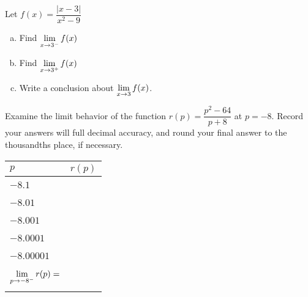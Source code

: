 \documentclass[notes]{subfiles}
\begin{document}
		\begin{ex}
			Let \(f(x) = \dfrac{|x-3|}{x^2-9}\)
			\begin{enumerate}[(a)]
				\item Find \(\displaystyle \lim_{x\to 3^-} f(x)\)
					
				\item Find \(\displaystyle \lim_{x\to 3^+} f(x)\)
					\newpage
					
				\item Write a conclusion about \(\displaystyle \lim_{x\to 3} f(x)\).
			\end{enumerate}
		\end{ex}
			
		\begin{ex}
			Examine the limit behavior of the function \(r(p) = \dfrac{p^2-64}{p+8}\) at \(p = -8\).  Record your answers will full decimal accuracy, and round your final answer to the thousandths place, if necessary.\\
			\begin{center}
				\begin{minipage}{.45\textwidth}
					\tabulinesep=1mm
					\begin{tabu}{|X[c]|X[1.5,c]|}\hline
						\(p\) 						& \(r(p)\) \\ \hline
												& \\
						\(-8.1\)					& \\ 
												& \\ \hline
												& \\
						\(-8.01\)	& \\
												& \\ \hline 
												& \\
						\(-8.001\)	& \\ 
												& \\ \hline
												& \\ 
						\(-8.0001\)	& \\ 
												& \\ \hline
												& \\
						\(-8.00001\)	&\\
												&\\ \hline\hline
												&\\
						\(\displaystyle \lim_{p\to -8^-}r(p)  =\) & \\
												&\\ \hline
					\end{tabu}
				\end{minipage}
				\begin{minipage}{.45\textwidth}

\end{minipage}
\end{center}
\end{ex}
\end{document}
